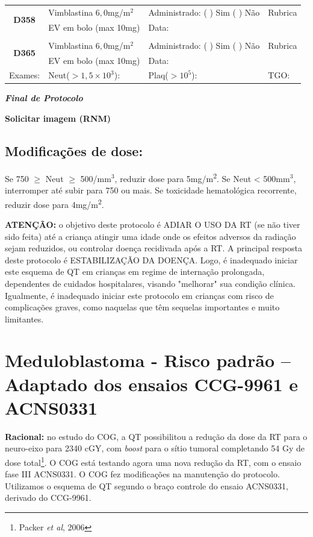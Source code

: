 \documentclass[11pt,a4paper,oldfontcommands]{memoir}
\begin{document}
\begin{center}
\begin{table}[H]
\begin{tabular}{p{}p{}|p{}|p{3cm}}
    \hline
    \multicolumn{1}{c|}{\multirow{2}{*}{\textbf{D358}}}&{Vimblastina \(6,0\)mg/m\(^2\)}&{Administrado: (  ) Sim (  ) Não}&{Rubrica}\\
    \multicolumn{1}{c|}{}&{EV em bolo (max 10mg)}&{Data:}&\\
    \hline
    \\
    \hline
    \multicolumn{1}{c|}{\multirow{2}{*}{\textbf{D365}}}&{Vimblastina \(6,0\)mg/m\(^2\)}&{Administrado: (  ) Sim (  ) Não}&{Rubrica}\\
    \multicolumn{1}{c|}{}&{EV em bolo (max 10mg)}&{Data:}&\\
    \hline
    {Exames:}&{Neut(\(>1,5\times10^3\)):}&{Plaq(\(>10^5\)):}&{TGO:}
    \\
   \hline
\end{tabular}
\end{table}
\textbf{\textit{Final de Protocolo}}

\textbf{Solicitar imagem (RNM)}
\end{center}
\subsection{Modificações de dose:}
Se 750 $\geq$ Neut $\geq$ 500/mm\(^3\), reduzir dose para 5mg/m\textsuperscript{2}. Se Neut < 500mm\(^3\), interromper até subir para 750 ou mais. Se toxicidade hematológica recorrente, reduzir dose para 4mg/m\textsuperscript{2}.

\textbf{ATENÇÃO:} o objetivo deste protocolo é ADIAR O USO DA RT (se não tiver sido feita) até a criança atingir uma idade onde os efeitos adversos da radiação sejam reduzidos, ou controlar doença recidivada após a RT. A principal resposta deste protocolo é ESTABILIZAÇÃO DA DOENÇA. Logo, é inadequado iniciar este esquema de QT em crianças em regime de internação prolongada, dependentes de cuidados hospitalares, visando "melhorar" sua condição clínica. Igualmente, é inadequado iniciar este protocolo em crianças com risco de complicações graves, como naquelas que têm sequelas importantes e muito limitantes.

\cleardoublepage
\section{Meduloblastoma - Risco padrão -- Adaptado dos ensaios CCG-9961 e ACNS0331}
{\let\thefootnote\relax{}}
\textbf{Racional:} no estudo do COG, a QT possibilitou a redução da dose da RT para o neuro-eixo para 2340 cGY, com \textit{boost} para o sítio tumoral completando 54 Gy de dose total\footnote{Packer \textit{et al}, 2006}. O COG está testando agora uma nova redução da RT, com o ensaio fase III ACNS0331. O COG fez modificações na manutenção do protocolo. Utilizamos o esquema de QT segundo o braço controle do ensaio ACNS0331, derivado do CCG-9961.
\end{document}
